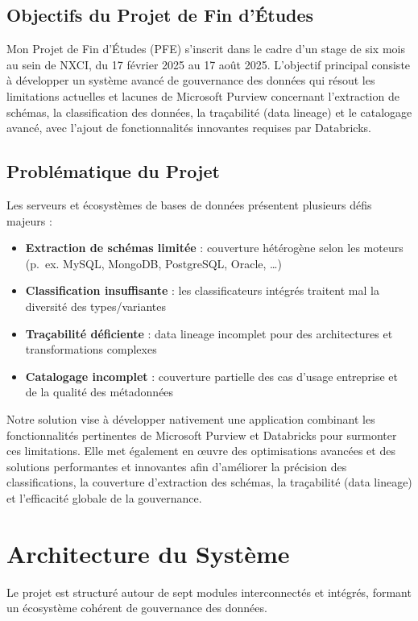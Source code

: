 \documentclass[12pt,a4paper]{article}
\begin{document}
\subsection{Objectifs du Projet de Fin d'Études}
Mon Projet de Fin d'Études (PFE) s'inscrit dans le cadre d'un stage de six mois au sein de NXCI, du 17 février 2025 au 17 août 2025. L'objectif principal consiste à développer un système avancé de gouvernance des données qui résout les limitations actuelles et lacunes de Microsoft Purview concernant l'extraction de schémas, la classification des données, la traçabilité (data lineage) et le catalogage avancé, avec l'ajout de fonctionnalités innovantes requises par Databricks.

\subsection{Problématique du Projet}
Les serveurs et écosystèmes de bases de données présentent plusieurs défis majeurs :
\begin{itemize}[leftmargin=1.2em]
  \item \textbf{Extraction de schémas limitée} : couverture hétérogène selon les moteurs (p.~ex. MySQL, MongoDB, PostgreSQL, Oracle, \dots)
  \item \textbf{Classification insuffisante} : les classificateurs intégrés traitent mal la diversité des types/variantes
  \item \textbf{Traçabilité déficiente} : data lineage incomplet pour des architectures et transformations complexes
  \item \textbf{Catalogage incomplet} : couverture partielle des cas d’usage entreprise et de la qualité des métadonnées
\end{itemize}
Notre solution vise à développer nativement une application combinant les fonctionnalités pertinentes de Microsoft Purview et Databricks pour surmonter ces limitations. Elle met également en œuvre des optimisations avancées et des solutions performantes et innovantes afin d'améliorer la précision des classifications, la couverture d'extraction des schémas, la traçabilité (data lineage) et l'efficacité globale de la gouvernance.

\section{Architecture du Système}
Le projet est structuré autour de sept modules interconnectés et intégrés, formant un écosystème cohérent de gouvernance des données.
\end{document}

